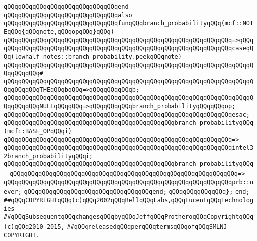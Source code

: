 \verb|qQQqqQQqqQQqqQQqqQQqqQQqqQQqqQQqend|\newline
\newline
\verb|qQQqqQQqqQQqqQQqqQQqqQQqqQQqqQQqalso|\newline
\verb|qQQqqQQqqQQqqQQqqQQqqQQqqQQqqQQqfunqQQqbranch_probabilityqQQq(mcf::NOTEqQQq{qQQqnote,qQQqopqQQq}qQQq)|\newline
\verb|qQQqqQQqqQQqqQQqqQQqqQQqqQQqqQQqqQQqqQQqqQQqqQQqqQQqqQQqqQQqqQQq=>qQQq|\newline
\verb|qQQqqQQqqQQqqQQqqQQqqQQqqQQqqQQqqQQqqQQqqQQqqQQqqQQqqQQqqQQqqQQqcaseqQQq(lowhalf_notes::branch_probability.peekqQQqnote)|\newline
\verb|qQQqqQQqqQQqqQQqqQQqqQQqqQQqqQQqqQQqqQQqqQQqqQQqqQQqqQQqqQQqqQQqqQQqqQQqqQQqqQQq#|\newline
\verb|qQQqqQQqqQQqqQQqqQQqqQQqqQQqqQQqqQQqqQQqqQQqqQQqqQQqqQQqqQQqqQQqqQQqqQQqqQQqqQQqTHEqQQqbqQQq=>qQQqqQQqqQQqb;|\newline
\verb|qQQqqQQqqQQqqQQqqQQqqQQqqQQqqQQqqQQqqQQqqQQqqQQqqQQqqQQqqQQqqQQqqQQqqQQqqQQqqQQqNULLqQQqqQQq=>qQQqqQQqqQQqbranch_probabilityqQQqqQQqop;|\newline
\verb|qQQqqQQqqQQqqQQqqQQqqQQqqQQqqQQqqQQqqQQqqQQqqQQqqQQqqQQqqQQqqQQqesac;|\newline
\newline
\verb|qQQqqQQqqQQqqQQqqQQqqQQqqQQqqQQqqQQqqQQqqQQqqQQqbranch_probabilityqQQq(mcf::BASE_OPqQQqi)|\newline
\verb|qQQqqQQqqQQqqQQqqQQqqQQqqQQqqQQqqQQqqQQqqQQqqQQqqQQqqQQqqQQqqQQq=>|\newline
\verb|qQQqqQQqqQQqqQQqqQQqqQQqqQQqqQQqqQQqqQQqqQQqqQQqqQQqqQQqqQQqqQQqintel32branch_probabilityqQQqi;|\newline
\newline
\verb|qQQqqQQqqQQqqQQqqQQqqQQqqQQqqQQqqQQqqQQqqQQqqQQqbranch_probabilityqQQq_|\newline
\verb|qQQqqQQqqQQqqQQqqQQqqQQqqQQqqQQqqQQqqQQqqQQqqQQqqQQqqQQqqQQqqQQq=>|\newline
\verb|qQQqqQQqqQQqqQQqqQQqqQQqqQQqqQQqqQQqqQQqqQQqqQQqqQQqqQQqqQQqqQQqprb::never;|\newline
\verb|qQQqqQQqqQQqqQQqqQQqqQQqqQQqqQQqqQQqend;|\newline
\newline
\verb|qQQqqQQqqQQqqQQq};|\newline
\verb|end;|\newline
\newline
\newline
\verb|##qQQqCOPYRIGHTqQQq(c)qQQq2002qQQqBellqQQqLabs,qQQqLucentqQQqTechnologies|\newline
\verb|##qQQqSubsequentqQQqchangesqQQqbyqQQqJeffqQQqProtheroqQQqCopyrightqQQq(c)qQQq2010-2015,|\newline
\verb|##qQQqreleasedqQQqperqQQqtermsqQQqofqQQqSMLNJ-COPYRIGHT.|\newline

